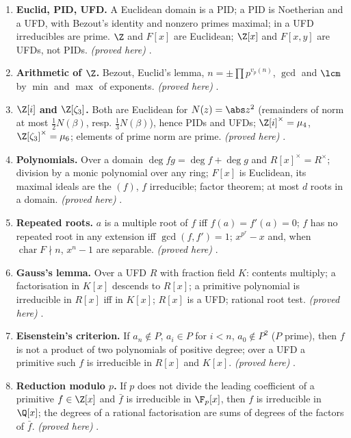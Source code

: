 \begin{enumerate}[label=\textbf{\thechapter.\arabic*}]
.
\item \textbf{Euclid, PID, UFD.} A Euclidean domain is a PID; a PID is Noetherian and a UFD, with Bezout's identity and
nonzero primes maximal; in a UFD irreducibles are prime. $\Z$ and $F[x]$ are Euclidean; $\Z[x]$ and $F[x,y]$ are UFDs, not PIDs.
\emph{(proved here)} .
\item \textbf{Arithmetic of $\Z$.} Bezout, Euclid's lemma, $n=\pm\prod p^{v_p(n)}$, $\gcd$ and $\lcm$ by $\min$ and $\max$ of exponents.
\emph{(proved here)} .
\item \textbf{$\Z[i]$ and $\Z[\zeta_3]$.} Both are Euclidean for $N(z)=\abs z^2$ (remainders of norm at most $\frac12N(\beta)$, resp.
$\frac13N(\beta)$), hence PIDs and UFDs; $\Z[i]^\times=\mu_4$, $\Z[\zeta_3]^\times=\mu_6$; elements of prime norm are prime.
\emph{(proved here)} .
\item \textbf{Polynomials.} Over a domain $\deg fg=\deg f+\deg g$ and $R[x]^\times=R^\times$; division by a monic polynomial over any
ring; $F[x]$ is Euclidean, its maximal ideals are the $(f)$, $f$ irreducible; factor theorem; at most $d$ roots in a domain.
\emph{(proved here)} .
\item \textbf{Repeated roots.} $a$ is a multiple root of $f$ iff $f(a)=f'(a)=0$; $f$ has no repeated root in any extension iff
$\gcd(f,f')=1$; $x^{p^r}-x$ and, when $\operatorname{char}F\nmid n$, $x^n-1$ are separable. \emph{(proved here)} .
\item \textbf{Gauss's lemma.} Over a UFD $R$ with fraction field $K$: contents multiply; a factorisation in $K[x]$ descends to
$R[x]$; a primitive polynomial is irreducible in $R[x]$ iff in $K[x]$; $R[x]$ is a UFD; rational root test.
\emph{(proved here)} .
\item \textbf{Eisenstein's criterion.} If $a_n\notin P$, $a_i\in P$ for $i<n$, $a_0\notin P^2$ ($P$ prime), then $f$ is not a product of two
polynomials of positive degree; over a UFD a primitive such $f$ is irreducible in $R[x]$ and $K[x]$. \emph{(proved here)}
.
\item \textbf{Reduction modulo $p$.} If $p$ does not divide the leading coefficient of a primitive $f\in\Z[x]$ and $\bar f$ is
irreducible in $\F_p[x]$, then $f$ is irreducible in $\Q[x]$; the degrees of a rational factorisation are sums of degrees of
the factors of $\bar f$. \emph{(proved here)} .

\end{enumerate}
